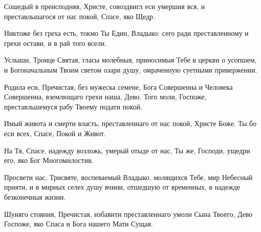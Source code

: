\begin{mymulticols}


Сошедый в преисподняя, Христе, совоздвигл еси умершия вся, и преставльшагося от нас покой, Спасе, яко Щедр. 


Никтоже без греха есть, токмо Ты Един, Владыко: сего ради преставленному и грехи остави, и в рай того всели.

\slava

Услыши, Троице Святая, гласы молебныя, приносимыя Тебе в церкви о усопшем, и Богоначальным Твоим светом озари душу, омраченную суетными привержении.

\inyne

Родила еси, Пречистая, без мужеска семене, Бога Совершенна и Человека Совершенна, вземлющаго грехи наша, Дево. Того моли, Госпоже, преставльшемуся рабу Твоему подати покой.

\vspace{\baselineskip}



Имый живота и смерти власть, преставленнаго от нас покой, Христе Боже. Ты бо еси всех, Спасе, Покой и Живот.


На Тя, Спасе, надежду возложь, умерый отыде от нас, Ты же, Господи, ущедри его, яко Бог Многомилостив.

\slava 

Просвети нас, Трисвяте, воспеваемый Владыко, молящихся Тебе, мир Небесный прияти, и в мирных селех душу вчини, отшедшую от временных, в надежде безконечныя жизни. 

\inyne 

Шуияго стояния, Пречистая, избавити преставленнаго умоли Сына Твоего, Дево Госпоже, яко Спаса и Бога нашего Мати Сущая.

\vspace{\baselineskip}



\end{mymulticols}
